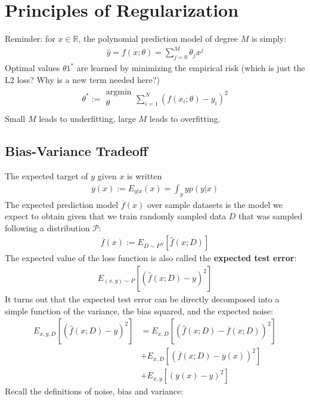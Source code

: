 \documentclass{report}
\newcommand{\tbf}{\textbf}
\newcommand{\argmin}[1] {
    \begin{array}{c}
        \text{argmin}\\
        #1\\
        \end{array}
    }
\newcommand{\yhat}{\hat{y}}
\begin{document}
\chapter{Principles of Regularization}
Reminder: for $x \in \mathbb{R}$, the polynomial prediction model of degree $M$ is simply:
\begin{align}
 \yhat = f(x;\theta) = \sum_{j=0}^M \theta_j x^j
\end{align}
Optimal values $\theta1^*$ are learned by minimizing the empirical risk (which is just the L2 loss? Why is a new term needed here?)
\begin{align}
 \theta^* := \argmin{\theta} \sum_{i=1}^N (f(x_i;\theta)-y_i)^2
\end{align}
Small $M$ leads to underfitting, large $M$ leads to overfitting.
\section{Bias-Variance Tradeoff}
The expected target of $y$ given $x$ is written 
\begin{align}
 \overline{y}(x) := E_{y|x}(x) = \int_y y p(y|x)  
\end{align}
The expected prediction model $\overline{f}(x)$ over sample datasets is the model we expect to obtain given that we train randomly sampled data $D$ that was sampled following a distribution $\mathcal{P}$:
\begin{align}
 \overline{f}(x) := E_{D \sim P^N}[\hat{f}(x;D)]
\end{align}
The expected value of the loss function is also called the \tbf{expected test error}:
\begin{align}
 E_{(x,y)\sim P}[(\hat{f}(x;D)-y)^2]
\end{align}
It turns out that the expected test error can be directly decomposed into a simple function of the variance, the bias squared, and the expected noise:
\begin{align}
 E_{x,y,D}[(\hat{f}(x;D)-y)^2] &= E_{x,D}[(\hat{f}(x;D)-\overline{f}(x;D))^2]\\ &+ E_{x,D}[(\overline{f}(x;D) - \overline{y}(x))^2]\\ &+ E_{x,y}[(\overline{y}(x) - y)^2]
\end{align}
Recall the definitions of noise, bias and variance:
\end{document}
